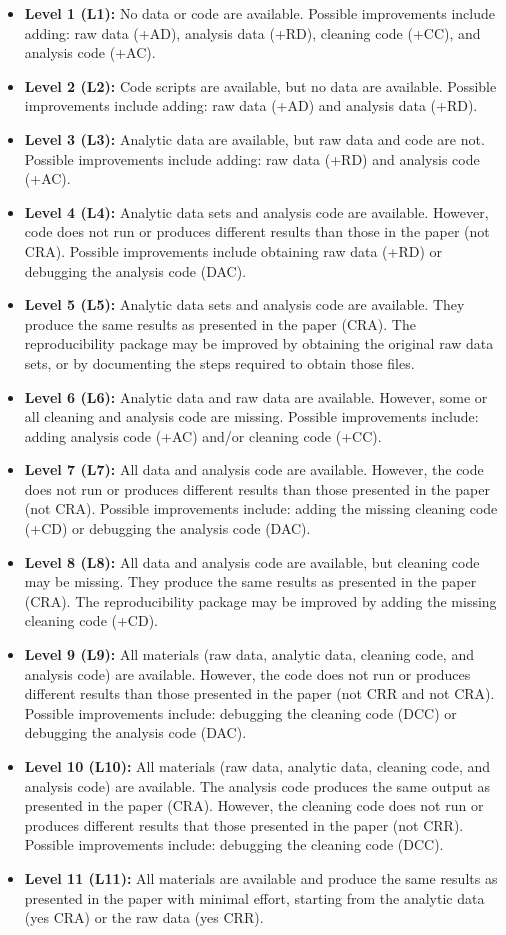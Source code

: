 \documentclass[]{book}
\begin{document}
\begin{itemize}
\item
  \textbf{Level 1 (L1):} No data or code are available. Possible improvements include adding: raw data (+AD), analysis data (+RD), cleaning code (+CC), and analysis code (+AC).
\item
  \textbf{Level 2 (L2):} Code scripts are available, but no data are available. Possible improvements include adding: raw data (+AD) and analysis data (+RD).
\item
  \textbf{Level 3 (L3):} Analytic data are available, but raw data and code are not. Possible improvements include adding: raw data (+RD) and analysis code (+AC).
\item
  \textbf{Level 4 (L4):} Analytic data sets and analysis code are available. However, code does not run or produces different results than those in the paper (not CRA). Possible improvements include obtaining raw data (+RD) or debugging the analysis code (DAC).
\item
  \textbf{Level 5 (L5):} Analytic data sets and analysis code are available. They produce the same results as presented in the paper (CRA). The reproducibility package may be improved by obtaining the original raw data sets, or by documenting the steps required to obtain those files.
\item
  \textbf{Level 6 (L6):} Analytic data and raw data are available. However, some or all cleaning and analysis code are missing. Possible improvements include: adding analysis code (+AC) and/or cleaning code (+CC).
\item
  \textbf{Level 7 (L7):} All data and analysis code are available. However, the code does not run or produces different results than those presented in the paper (not CRA). Possible improvements include: adding the missing cleaning code (+CD) or debugging the analysis code (DAC).
\item
  \textbf{Level 8 (L8):} All data and analysis code are available, but cleaning code may be missing. They produce the same results as presented in the paper (CRA). The reproducibility package may be improved by adding the missing cleaning code (+CD).
\item
  \textbf{Level 9 (L9):} All materials (raw data, analytic data, cleaning code, and analysis code) are available. However, the code does not run or produces different results than those presented in the paper (not CRR and not CRA). Possible improvements include: debugging the cleaning code (DCC) or debugging the analysis code (DAC).
\item
  \textbf{Level 10 (L10):} All materials (raw data, analytic data, cleaning code, and analysis code) are available. The analysis code produces the same output as presented in the paper (CRA). However, the cleaning code does not run or produces different results that those presented in the paper (not CRR). Possible improvements include: debugging the cleaning code (DCC).
\item
  \textbf{Level 11 (L11):} All materials are available and produce the same results as presented in the paper with minimal effort, starting from the analytic data (yes CRA) or the raw data (yes CRR).
\end{itemize}
\end{document}
